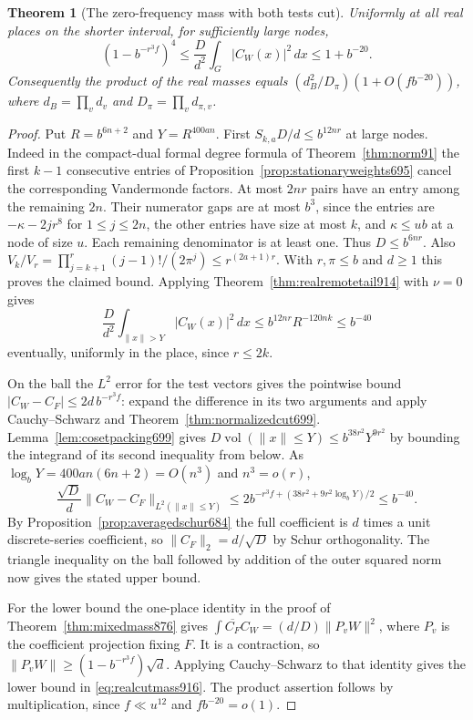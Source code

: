 \documentclass[a4paper,11pt]{article}
\newtheorem{theorem}[proposition]{Theorem}
\theoremstyle{definition}
\theoremstyle{remark}
\numberwithin{equation}{section}
\begin{document}
\begin{theorem}[The zero-frequency mass with both tests cut]
\leavevmode\label{thm:realcutmass916}
Uniformly at all real places on the shorter interval, for
sufficiently large nodes,
\begin{equation}
 (1-b^{-r^3 f})^4
 \le \frac D{d^2}\int_G |C_W(x)|^2\,dx
 \le 1+b^{-20}.
 \label{eq:realcutmass916}
\end{equation}
Consequently the product of the real masses equals
\((d_B^2/D_\pi)(1+O(f b^{-20}))\), where
\(d_B=\prod_v d_v\) and \(D_\pi=\prod_vd_{\pi,v}\).
\end{theorem}
\begin{proof}
Put \(R=b^{6n+2}\) and \(Y=R^{400an}\).
First \(S_{k,a}D/d\le b^{12nr}\) at large nodes.
Indeed in the compact-dual formal degree formula of
Theorem~\ref{thm:norm91} the first \(k-1\) consecutive
entries of Proposition~\ref{prop:stationaryweights695}
cancel the corresponding Vandermonde factors. At most
\(2nr\) pairs have an entry among the remaining \(2n\).
Their numerator gaps are at most \(b^3\), since the entries
are \(-\kappa-2jr^8\) for \(1\le j\le2n\), the other entries
have size at most \(k\), and \(\kappa\le ub\) at a node of
size \(u\). Each remaining denominator is at least one.
Thus \(D\le b^{6nr}\). Also
\(V_k/V_r=\prod_{j=k+1}^r(j-1)!/(2\pi^j)
 \le r^{(2a+1)r}\). With \(r,\pi\le b\) and \(d\ge1\)
this proves the claimed bound. Applying
Theorem~\ref{thm:realremotetail914} with \(\nu=0\) gives
\[
 \frac D{d^2}\int_{\|x\|>Y}|C_W(x)|^2\,dx
       \le b^{12nr}R^{-120nk}\le b^{-40}
\]
eventually, uniformly in the place, since \(r\le2k\).

On the ball the \(L^2\) error for the test vectors gives the
pointwise bound \(|C_W-C_F|\le2d\,b^{-r^3f}\):
expand the difference in its two arguments and apply
Cauchy--Schwarz and Theorem~\ref{thm:normalizedcut699}.
Lemma~\ref{lem:cosetpacking699} gives
\(D\operatorname{vol}(\|x\|\le Y)\le b^{38r^2}Y^{9r^2}\)
by bounding the integrand of its second inequality from below.
As \(\log_bY=400an(6n+2)=O(n^3)\) and \(n^3=o(r)\),
\[
 \frac{\sqrt D}{d}
 \|C_W-C_F\|_{L^2(\|x\|\le Y)}
        \le 2b^{-r^3 f+(38r^2+9r^2\log_bY)/2}\le b^{-40}.
\]
By Proposition~\ref{prop:averagedschur684} the full
coefficient is \(d\) times a unit discrete-series coefficient,
so \(\|C_F\|_2=d/\sqrt D\) by Schur orthogonality. The
triangle inequality on the ball followed by addition of the
outer squared norm now gives the stated upper bound.

For the lower bound the one-place identity in the proof of
Theorem~\ref{thm:mixedmass876} gives
\(\int\overline{C_F}C_W=(d/D)\|P_v W\|^2\), where \(P_v\)
is the coefficient projection fixing \(F\).
It is a contraction, so
\(\|P_v W\|\ge (1-b^{-r^3 f})\sqrt d\). Applying
Cauchy--Schwarz to that identity gives the lower bound in
\eqref{eq:realcutmass916}. The product assertion follows by
multiplication, since \(f\ll u^{12}\) and \(f b^{-20}=o(1)\).
\end{proof}
\end{document}
